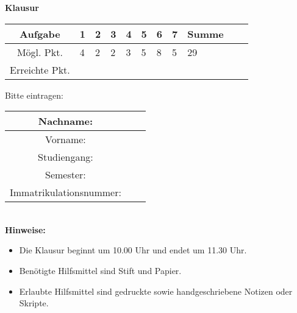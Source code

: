 \begin{center}
\Huge \textbf{Klausur}
\end{center}
\bigskip\bigskip\bigskip
\Large
\begin{center}
\begin{tabular}{|Sl||p{0.5cm}|p{0.5cm}|p{0.5cm}|p{0.5cm}|p{0.5cm}|p{0.5cm}|p{0.5cm}||Sc|}
\hline
Aufgabe & \textbf{1} & \textbf{2} & \textbf{3} & \textbf{4} & \textbf{5} & \textbf{6} & \textbf{7} & \textbf{Summe}\\
\hline
Mögl. Pkt. &  4  & 2  & 2  & 3  & 5  & 8  & 5  &  29  \\
\hline
Erreichte Pkt. &    &   &   &   &   &   &     &    \\
\hline
\end{tabular}
\end{center}

\bigskip\bigskip\bigskip
Bitte eintragen:\\
\begin{center}
\begin{tabular}{|Sl|p{8cm}|}
\hline
Nachname: & \\
\hline
Vorname: & \\
\hline
Studiengang: & \\
\hline 
Semester: & \\
\hline 
Immatrikulationsnummer: & \\
\hline
\end{tabular}\\[1cm]
\textbf{Hinweise:}
\begin{itemize}
\item Die Klausur beginnt um 10.00 Uhr und endet um 11.30 Uhr.
\item Ben\"otigte Hilfsmittel sind Stift und Papier.
\item Erlaubte Hilfsmittel sind gedruckte sowie handgeschriebene Notizen oder Skripte. 
\end{itemize}
\end{center}

\newpage
\normalsize
